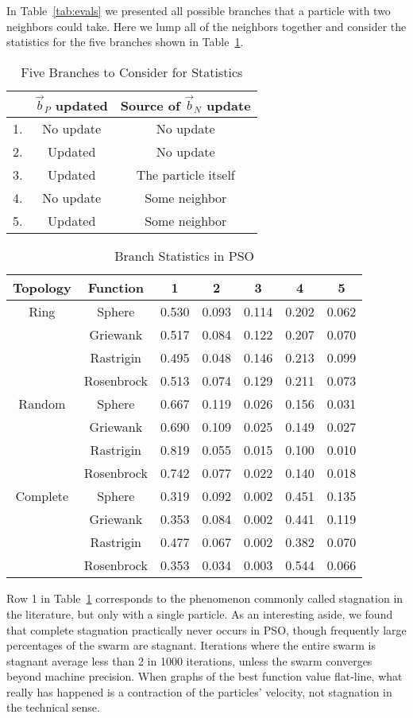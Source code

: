 \documentclass[journal,letterpaper]{IEEEtran}
\providecommand{\nbest}{\ensuremath{\Vec{b}_N}}
\providecommand{\pbest}{\ensuremath{\Vec{b}_P}}
\begin{document}
In Table~\ref{tab:evals} we presented all possible branches that a particle
with two neighbors could take.  Here we lump all of the neighbors together and
consider the statistics for the five branches shown in Table~\ref{tab:branches}.

\begin{table}
  \caption{Five Branches to Consider for Statistics}
  \label{tab:branches}
  \centering
  \begin{tabular}{rc|c}
	&$\pbest$ updated&Source of $\nbest$ update\\
	\hline
	1.&No update&No update\\
	2.&Updated&No update\\
	3.&Updated&The particle itself\\
	4.&No update&Some neighbor\\
	5.&Updated&Some neighbor\\
  \end{tabular}
\end{table}

\begin{table}
  \caption{Branch Statistics in PSO}
  \label{tab:stats}
  \centering
  \begin{tabular}{c|c|c|c|c|c|c}
	Topology&Function&1&2&3&4&5\\
	\hline
	Ring&Sphere&0.530&0.093&0.114&0.202&0.062\\
	&Griewank&0.517&0.084&0.122&0.207&0.070\\
	&Rastrigin&0.495&0.048&0.146&0.213&0.099\\
	&Rosenbrock&0.513&0.074&0.129&0.211&0.073\\
	\hline
	Random&Sphere&0.667&0.119&0.026&0.156&0.031\\
	&Griewank&0.690&0.109&0.025&0.149&0.027\\
	&Rastrigin&0.819&0.055&0.015&0.100&0.010\\
	&Rosenbrock&0.742&0.077&0.022&0.140&0.018\\
	\hline
	Complete&Sphere&0.319&0.092&0.002&0.451&0.135\\
	&Griewank&0.353&0.084&0.002&0.441&0.119\\
	&Rastrigin&0.477&0.067&0.002&0.382&0.070\\
	&Rosenbrock&0.353&0.034&0.003&0.544&0.066\\
  \end{tabular}
\end{table}

Row 1 in Table~\ref{tab:branches} corresponds to the phenomenon commonly called
stagnation in the literature, but only with a single particle.  As an
interesting aside, we found that complete stagnation practically never occurs
in PSO, though frequently large percentages of the swarm are stagnant.
Iterations where the entire swarm is stagnant average less than 2 in 1000
iterations, unless the swarm converges beyond machine precision.  When graphs
of the best function value flat-line, what really has happened is a contraction
of the particles' velocity, not stagnation in the technical sense.  
\end{document}
